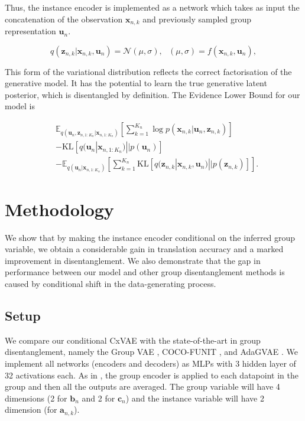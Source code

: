 \documentclass{article} %
\begin{document}
Thus, the instance encoder is implemented as a network which takes as input the concatenation of the observation $\mathbf{x}_{n,k}$ and previously sampled group representation $\mathbf{u}_n$.

\begin{equation}
q(\mathbf{z}_{n,k} | \mathbf{x}_{n,k}, \mathbf{u}_n) = \mathcal{N} (\mu, \sigma), ~~~ (\mu, \sigma) = f (\mathbf{x}_{n,k}, \mathbf{u}_n),
\end{equation}

This form of the variational distribution reflects the correct factorisation of the generative model. It has the potential to learn the true generative latent posterior, which is disentangled by definition. The Evidence Lower Bound for our model is

\begin{align}
& \mathbb{E}_{q(\mathbf{u}_n, \mathbf{z}_{n, 1:K_n} | \mathbf{x}_{n, 1:K_n})} \left[\sum_{k=1}^{K_n} \log p(\mathbf{x}_{n,k} | \mathbf{u}_n, \mathbf{z}_{n,k})\right] \\ & - \mathrm{KL} [q(\mathbf{u}_n| \mathbf{x}_{n,1:K_n}) || p(\mathbf{u}_n)] \\ & - \mathbb{E}_{q(\mathbf{u}_n | \mathbf{x}_{n,1:K_n})}\left[\sum_{k=1}^{K_n} \mathrm{KL}[q(\mathbf{z}_{n,k} | \mathbf{x}_{n,k},\mathbf{u}_n) || p(\mathbf{z}_{n,k})]\right].
\end{align}

\section{Methodology}

We show that by making the instance encoder conditional on the inferred group variable, we obtain a considerable gain in translation accuracy and a marked improvement in disentanglement. We also demonstrate that the gap in performance between our model and other group disentanglement methods is caused by conditional shift in the data-generating process.

\subsection{Setup}
\label{sec:setup}

We compare our conditional CxVAE with the state-of-the-art in group disentanglement, namely the Group VAE \citep{Hosoya2019GroupbasedLO, Bouchacourt2018MultiLevelVA}, COCO-FUNIT \citep{Saito2020Coco}, and AdaGVAE \citep{Locatello2019ChallengingCA}. We implement all networks (encoders and decoders) as MLPs with 3 hidden layer of 32 activations each. As in \citet{Hosoya2019GroupbasedLO}, the group encoder is applied to each datapoint in the group and then all the outputs are averaged. The group variable will have 4 dimensions (2 for $\mathbf{b}_n$ and 2 for $\mathbf{c}_n$) and the instance variable will have 2 dimension (for $\mathbf{a}_{n,k}$). 
\end{document}
